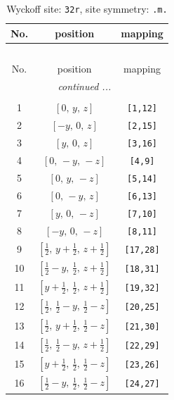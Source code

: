 \documentclass[fleqn,8pt]{jsarticle}
\begin{document}
\begin{longtable}{ccc}
\caption{Wyckoff site: {\tt 32r}, site symmetry: {\tt .m.}}
 \\
 \hline \hline
No. & position & mapping \\ \hline \endfirsthead

\multicolumn{2}{l}{\tablename\ \thetable{}} \\
 \hline \hline
No. & position & mapping \\ \hline \endhead

 \hline \hline
\multicolumn{2}{r}{\footnotesize\it continued ...} \\ \endfoot

 \hline \hline
\multicolumn{2}{r}{} \\ \endlastfoot

1 & $\left[ 0,\, y,\, z \right]$ & {\tt [1,12]} \\ \hline
2 & $\left[ - y,\, 0,\, z \right]$ & {\tt [2,15]} \\ \hline
3 & $\left[ y,\, 0,\, z \right]$ & {\tt [3,16]} \\ \hline
4 & $\left[ 0,\, - y,\, - z \right]$ & {\tt [4,9]} \\ \hline
5 & $\left[ 0,\, y,\, - z \right]$ & {\tt [5,14]} \\ \hline
6 & $\left[ 0,\, - y,\, z \right]$ & {\tt [6,13]} \\ \hline
7 & $\left[ y,\, 0,\, - z \right]$ & {\tt [7,10]} \\ \hline
8 & $\left[ - y,\, 0,\, - z \right]$ & {\tt [8,11]} \\ \hline
9 & $\left[ \frac{1}{2},\, y + \frac{1}{2},\, z + \frac{1}{2} \right]$ & {\tt [17,28]} \\ \hline
10 & $\left[ \frac{1}{2} - y,\, \frac{1}{2},\, z + \frac{1}{2} \right]$ & {\tt [18,31]} \\ \hline
11 & $\left[ y + \frac{1}{2},\, \frac{1}{2},\, z + \frac{1}{2} \right]$ & {\tt [19,32]} \\ \hline
12 & $\left[ \frac{1}{2},\, \frac{1}{2} - y,\, \frac{1}{2} - z \right]$ & {\tt [20,25]} \\ \hline
13 & $\left[ \frac{1}{2},\, y + \frac{1}{2},\, \frac{1}{2} - z \right]$ & {\tt [21,30]} \\ \hline
14 & $\left[ \frac{1}{2},\, \frac{1}{2} - y,\, z + \frac{1}{2} \right]$ & {\tt [22,29]} \\ \hline
15 & $\left[ y + \frac{1}{2},\, \frac{1}{2},\, \frac{1}{2} - z \right]$ & {\tt [23,26]} \\ \hline
16 & $\left[ \frac{1}{2} - y,\, \frac{1}{2},\, \frac{1}{2} - z \right]$ & {\tt [24,27]} \\ \hline

\end{longtable}
\end{document}
